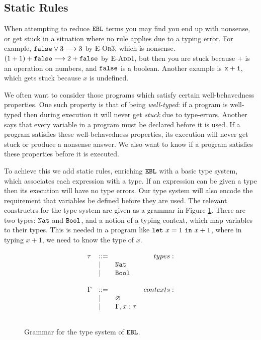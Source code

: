 \subsection{Static Rules}

When attempting to reduce $\mathtt{EBL}$ terms you may find you end up with nonsense, or get stuck in a situation where no rule applies due to a typing error. For example, $\mathtt{false} \lor 3 \longrightarrow 3$ by \textsc{E-Or3}, which is nonsense. $(1+1)+\mathtt{false} \longrightarrow 2 + \mathtt{false}$ by \textsc{E-Add1}, but then you are stuck because $+$ is an operation on numbers, and $\mathtt{false}$ is a boolean. Another example is $\mathtt{x+1}$, which gets stuck because $x$ is undefined.

We often want to consider those programs which satisfy certain well-behavedness properties. One such property is that of being \textit{well-typed}: if a program is well-typed then during execution it will never get \textit{stuck} due to type-errors. Another says that every variable in a program must be declared before it is used. If a program satisfies these well-behavedness properties, its execution will never get stuck or produce a nonsense answer. We also want to know if a program satisfies these properties before it is executed.

To achieve this we add static rules, enriching $\mathtt{EBL}$ with a basic type system, which associates each expression with a type. If an expression can be given a type then its execution will have no type errors. Our type system will also encode the requirement that variables be defined before they are used. The relevant constructrs for the type system are given as a grammar in Figure \ref{fig:calc_types}. There are two types: $\mathtt{Nat}$ and $\mathtt{Bool}$, and a notion of a typing context, which map variables to their types. This is needed in a program like $\mathtt{let}~ x = 1~\mathtt{in}~ x+1$, where in typing $x+1$, we need to know the type of $x$.

\begin{figure}[h]

\[
\begin{array}{c}

\begin{array}{lllr}

\tau & ::= & ~ & types: \\
	& | & \mathtt{Nat} \\
	& | & \mathtt{Bool} \\
	&&\\
	
\Gamma & ::= & ~ & contexts: \\
	& | & \varnothing \\
	& | & \Gamma, x: \tau \\
	&&\\
\end{array}

\end{array}
\]

\vspace{-12pt}
\caption{Grammar for the type system of $\mathtt{EBL}$.}
\label{fig:calc_types}
\end{figure}

